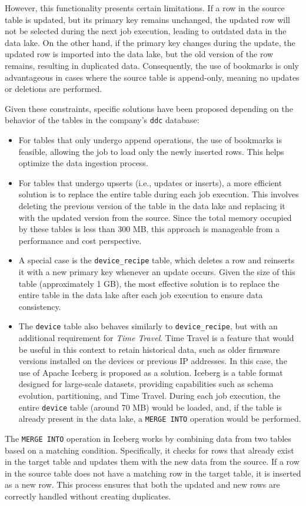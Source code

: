 However, this functionality presents certain limitations. If a row in the source table is updated, but its primary key remains unchanged, the updated row will not be selected during the next job execution, leading to outdated data in the data lake. On the other hand, if the primary key changes during the update, the updated row is imported into the data lake, but the old version of the row remains, resulting in duplicated data. Consequently, the use of bookmarks is only advantageous in cases where the source table is append-only, meaning no updates or deletions are performed.

Given these constraints, specific solutions have been proposed depending on the behavior of the tables in the company's \texttt{ddc} database:
\begin{itemize}
    \item For tables that only undergo append operations, the use of bookmarks is feasible, allowing the job to load only the newly inserted rows. This helps optimize the data ingestion process.
    \item For tables that undergo upserts (i.e., updates or inserts), a more efficient solution is to replace the entire table during each job execution. This involves deleting the previous version of the table in the data lake and replacing it with the updated version from the source. Since the total memory occupied by these tables is less than 300 MB, this approach is manageable from a performance and cost perspective.
    \item A special case is the \texttt{device\_recipe} table, which deletes a row and reinserts it with a new primary key whenever an update occurs. Given the size of this table (approximately 1 GB), the most effective solution is to replace the entire table in the data lake after each job execution to ensure data consistency.
    \item The \texttt{device} table also behaves similarly to \texttt{device\_recipe}, but with an additional requirement for \textit{Time Travel}. Time Travel is a feature that would be useful in this context to retain historical data, such as older firmware versions installed on the devices or previous IP addresses. In this case, the use of Apache Iceberg is proposed as a solution. Iceberg is a table format designed for large-scale datasets, providing capabilities such as schema evolution, partitioning, and Time Travel. During each job execution, the entire \texttt{device} table (around 70 MB) would be loaded, and, if the table is already present in the data lake, a \texttt{MERGE INTO} operation would be performed.
\end{itemize}
The \texttt{MERGE INTO} operation in Iceberg works by combining data from two tables based on a matching condition. Specifically, it checks for rows that already exist in the target table and updates them with the new data from the source. If a row in the source table does not have a matching row in the target table, it is inserted as a new row. This process ensures that both the updated and new rows are correctly handled without creating duplicates.

